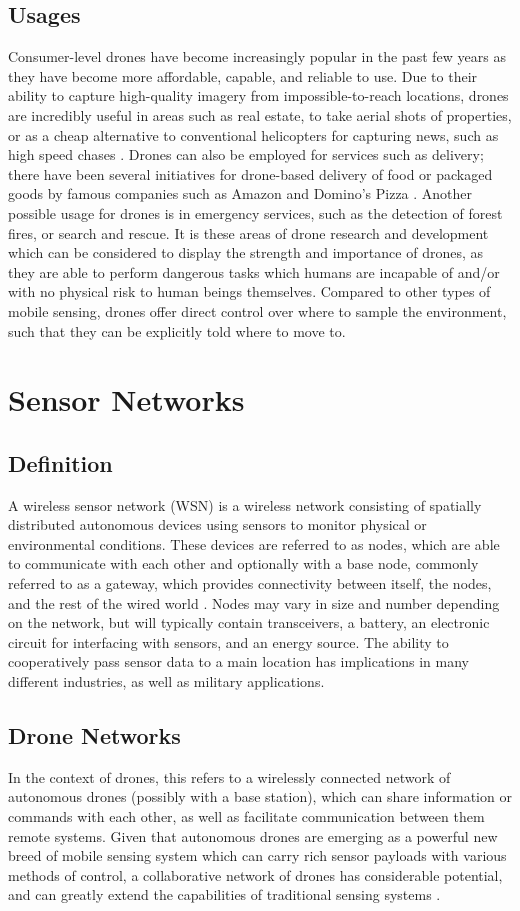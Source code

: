 		\subsection{Usages}
		Consumer-level drones have become increasingly popular in the past few years as they have become more affordable, capable, and reliable to use. Due to their ability to capture high-quality imagery from impossible-to-reach locations, drones are incredibly useful in areas such as real estate, to take aerial shots of properties, or as a cheap alternative to conventional helicopters for capturing news, such as high speed chases \cite{josephdussault2014}. Drones can also be employed for services such as delivery; there have been several initiatives for drone-based delivery of food or packaged goods by famous companies such as Amazon and Domino's Pizza \cite{marcusfaires2015}. Another possible usage for drones is in emergency services, such as the detection of forest fires, or search and rescue. It is these areas of drone research and development which can be considered to display the strength and importance of drones, as they are able to perform dangerous tasks which humans are incapable of and/or with no physical risk to human beings themselves. Compared to other types of mobile sensing, drones offer direct control over where to sample the environment, such that they can be explicitly told where to move to.
	\section{Sensor Networks}
		\subsection{Definition}
		A wireless sensor network (WSN) is a wireless network consisting of spatially distributed autonomous devices using sensors to monitor physical or environmental conditions. These devices are referred to as nodes, which are able to communicate with each other and optionally with a base node, commonly referred to as a gateway, which provides connectivity between itself, the nodes, and the rest of the wired world \cite{ nationalinstruments2012}. Nodes may vary in size and number depending on the network, but will typically contain transceivers, a battery, an electronic circuit for interfacing with sensors, and an energy source.  The ability to cooperatively pass sensor data to a main location has implications in many different industries, as well as military applications.
		\subsection{Drone Networks}
		In the context of drones, this refers to a wirelessly connected network of autonomous drones (possibly with a base station), which can share information or commands with each other, as well as facilitate communication between them remote systems.  Given that autonomous drones are emerging as a powerful new breed of mobile sensing system which can carry rich sensor payloads with various methods of control, a collaborative network of drones has considerable potential, and can greatly extend the capabilities of traditional sensing systems \cite{lucamottola2014}. 
